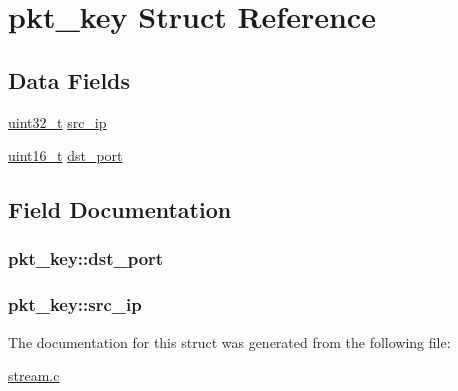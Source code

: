 \hypertarget{structpkt__key}{
\section{pkt\_\-key Struct Reference}
\label{structpkt__key}
}
\subsection*{Data Fields}
\begin{DoxyCompactItemize}
\item 
\hyperlink{spp__ai_8h_a435d1572bf3f880d55459d9805097f62}{uint32\_\-t} \hyperlink{structpkt__key_a3a091c20dafb8b3f689db00c5b2f8ddb}{src\_\-ip}
\item 
\hyperlink{spp__ai_8h_a273cf69d639a59973b6019625df33e30}{uint16\_\-t} \hyperlink{structpkt__key_af77f5eb1f4cd88b43fe99fd73553351d}{dst\_\-port}
\end{DoxyCompactItemize}


\subsection{Field Documentation}
\hypertarget{structpkt__key_af77f5eb1f4cd88b43fe99fd73553351d}{
\subsubsection[{dst\_\-port}]{ {\bf pkt\_\-key::dst\_\-port}}}
\label{structpkt__key_af77f5eb1f4cd88b43fe99fd73553351d}
\hypertarget{structpkt__key_a3a091c20dafb8b3f689db00c5b2f8ddb}{
\subsubsection[{src\_\-ip}]{ {\bf pkt\_\-key::src\_\-ip}}}
\label{structpkt__key_a3a091c20dafb8b3f689db00c5b2f8ddb}


The documentation for this struct was generated from the following file:\begin{DoxyCompactItemize}
\item 
\hyperlink{stream_8c}{stream.c}\end{DoxyCompactItemize}
